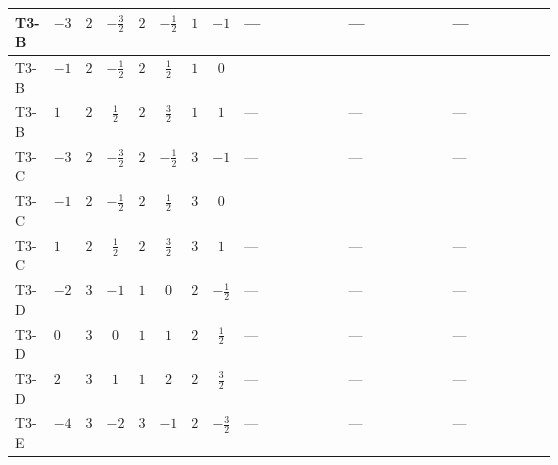 \documentclass[8pt]{article}
\begin{document}
\begin{landscape}
\begin{longtable}{@{}llcccccc >{\raggedright\arraybackslash}p{0.21\linewidth} >{\raggedright\arraybackslash}p{0.21\linewidth} >{\raggedright\arraybackslash}p{0.21\linewidth}@{}}
\midrule
T3-B & $-3$ & $2$ & $-\frac{3}{2}$ & $2$ & $-\frac{1}{2}$ & $1$ & $-1$ & --- & --- & --- \\
\midrule
T3-B & $-1$ & $2$ & $-\frac{1}{2}$ & $2$ & $\frac{1}{2}$ & $1$ & $0$ & \scriptsize\adjustbox{max width=\linewidth}{$\begin{gathered} -64 {\lambda_{9}} \left({\lambda_{9}}\right)^{*}\end{gathered}$} & \scriptsize\adjustbox{max width=\linewidth}{$\begin{gathered} -4 {\lambda_{10}} (5 \left({\lambda_{10}}\right)^{*}+\left({\lambda_{11}}\right)^{*})\end{gathered}$} & \scriptsize\adjustbox{max width=\linewidth}{$\begin{gathered} -4 {\lambda_{11}} (\left({\lambda_{10}}\right)^{*}+5 \left({\lambda_{11}}\right)^{*})\end{gathered}$} \\
\midrule
T3-B & $1$ & $2$ & $\frac{1}{2}$ & $2$ & $\frac{3}{2}$ & $1$ & $1$ & --- & --- & --- \\
\midrule
T3-C & $-3$ & $2$ & $-\frac{3}{2}$ & $2$ & $-\frac{1}{2}$ & $3$ & $-1$ & --- & --- & --- \\
\midrule
T3-C & $-1$ & $2$ & $-\frac{1}{2}$ & $2$ & $\frac{1}{2}$ & $3$ & $0$ & \scriptsize\adjustbox{max width=\linewidth}{$\begin{gathered} -64 {\lambda_{9}} \left({\lambda_{9}}\right)^{*}\end{gathered}$} & \scriptsize\adjustbox{max width=\linewidth}{$\begin{gathered} -4 {\lambda_{10}} (5 \left({\lambda_{10}}\right)^{*}+\left({\lambda_{11}}\right)^{*})\end{gathered}$} & \scriptsize\adjustbox{max width=\linewidth}{$\begin{gathered} -4 {\lambda_{11}} (\left({\lambda_{10}}\right)^{*}+5 \left({\lambda_{11}}\right)^{*})\end{gathered}$} \\
\midrule
T3-C & $1$ & $2$ & $\frac{1}{2}$ & $2$ & $\frac{3}{2}$ & $3$ & $1$ & --- & --- & --- \\
\midrule
T3-D & $-2$ & $3$ & $-1$ & $1$ & $0$ & $2$ & $-\frac{1}{2}$ & --- & --- & --- \\
\midrule
T3-D & $0$ & $3$ & $0$ & $1$ & $1$ & $2$ & $\frac{1}{2}$ & --- & --- & --- \\
\midrule
T3-D & $2$ & $3$ & $1$ & $1$ & $2$ & $2$ & $\frac{3}{2}$ & --- & --- & --- \\
\midrule
T3-E & $-4$ & $3$ & $-2$ & $3$ & $-1$ & $2$ & $-\frac{3}{2}$ & --- & --- & --- \\

\end{longtable}
\end{landscape}
\end{document}
